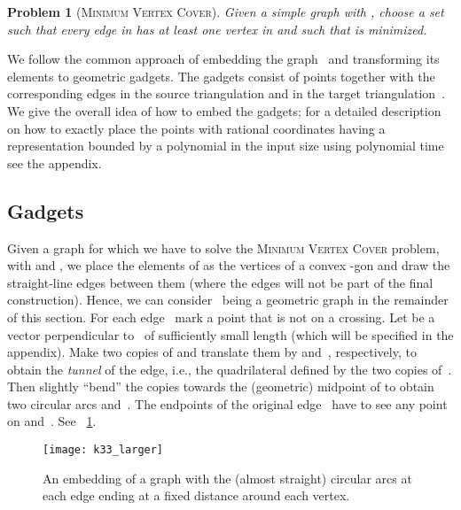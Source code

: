 \documentclass[11pt,a4paper]{article}
\newtheorem{problem}{Problem}
\begin{document}
\begin{problem}[\textsc{Minimum Vertex Cover}]
Given a simple graph  with , choose a set  such that every edge in  has at least one vertex in  and such that  is minimized.
\end{problem}

We follow the common approach of embedding the graph~ and transforming its elements to geometric gadgets.
The gadgets consist of points together with the corresponding edges in the source triangulation  and in the target triangulation~.
We give the overall idea of how to embed the gadgets; for a detailed description on how to exactly place the points with rational coordinates having a representation bounded by a polynomial in the input size using polynomial time see the appendix.

\subsection{Gadgets}
Given a graph  for which we have to solve the \textsc{Minimum Vertex Cover} problem, with  and , we place the elements of  as the vertices of a convex -gon and draw the straight-line edges between them (where the edges will not be part of the final construction).
Hence, we can consider~ being a geometric graph in the remainder of this section.
For each edge~ mark a point  that is not on a crossing.
Let  be a vector perpendicular to~ of sufficiently small length (which will be specified in the appendix).
Make two copies of  and translate them by  and~, respectively, to obtain the \emph{tunnel} of the edge, i.e., the quadrilateral defined by the two copies of~.
Then slightly ``bend'' the copies towards the (geometric) midpoint of  to obtain two circular arcs  and~.
The endpoints of the original edge~ have to see any point on  and~.
See \figurename~\ref{fig_k33}.

\begin{figure}
\centering
\texttt{[image: k33\_larger]}
\caption{An embedding of a graph with the (almost straight) circular arcs at each edge ending at a fixed distance around each vertex.}
\label{fig_k33}
\end{figure}
\end{document}
